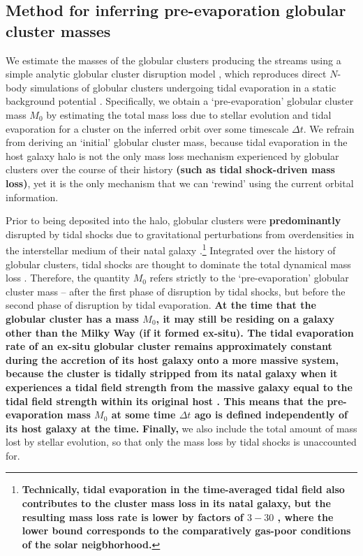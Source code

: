 \documentclass[twocolumn]{aastex63}
\newcommand{\changes}[1]{{\textbf{#1}}}
\begin{document}
\subsection{Method for inferring pre-evaporation globular cluster masses}
We estimate the masses of the globular clusters producing the streams using a simple analytic globular cluster disruption model \citep{lamers05}, which reproduces direct $N$-body simulations of globular clusters undergoing tidal evaporation in a static background potential \citep{baumgardt03}.
Specifically, we obtain a `pre-evaporation' globular cluster mass $M_0$ by estimating the total mass loss due to stellar evolution and tidal evaporation for a cluster on the inferred orbit over some timescale $\Delta t$.
We refrain from deriving an `initial' globular cluster mass, because tidal evaporation in the host galaxy halo is not the only mass loss mechanism experienced by globular clusters over the course of their history \changes{(such as tidal shock-driven mass loss)}, yet it is the only mechanism that we can `rewind' using the current orbital information.

Prior to being deposited into the halo, globular clusters were \changes{predominantly} disrupted by tidal shocks due to gravitational perturbations from overdensities in the interstellar medium of their natal galaxy \citep[e.g.][]{gieles06,elmegreen:2010b,kruijssen11,miholics17,pfeffer:2018}.\footnote{\changes{Technically, tidal evaporation in the time-averaged tidal field also contributes to the cluster mass loss in its natal galaxy, but the resulting mass loss rate is lower by factors of $3{-}30$ \citep{lamers06,kruijssen15b}, where the lower bound corresponds to the comparatively gas-poor conditions of the solar neigbhorhood.}}
Integrated over the history of globular clusters, tidal shocks are thought to dominate the total dynamical mass loss \citep[\changes{$50{-}95\%$ of the dynamical mass loss is estimated to be driven by tidal shocks, see e.g. fig.~6 of}][]{kruijssen15b}.
Therefore, the quantity $M_0$ refers strictly to the `pre-evaporation' globular cluster mass -- after the first phase of disruption by tidal shocks, but before the second phase of disruption by tidal evaporation.
\changes{At the time that the globular cluster has a mass $M_0$, it may still be residing on a galaxy other than the Milky Way (if it formed ex-situ).
The tidal evaporation rate of an ex-situ globular cluster remains approximately constant during the accretion of its host galaxy onto a more massive system, because the cluster is tidally stripped from its natal galaxy when it experiences a tidal field strength from the massive galaxy equal to the tidal field strength  within its original host \citep[e.g.][]{rieder13,lamers17}.
This means that the pre-evaporation mass $M_0$ at some time $\Delta t$ ago is defined independently of its host galaxy at the time.}
\changes{Finally,} we also include the total amount of mass lost by stellar evolution, so that only the mass loss by tidal shocks is unaccounted for.
\end{document}
